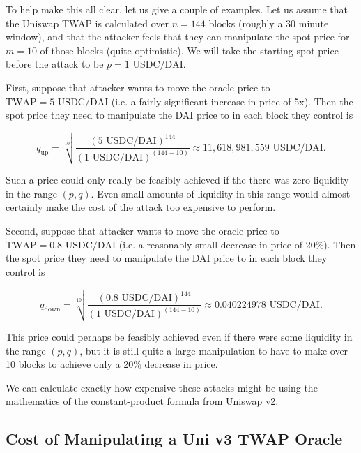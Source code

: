 \documentclass[a4paper, 11pt]{article}
\begin{document}
To help make this all clear, let us give a couple of examples. Let us assume that the Uniswap TWAP is calculated over $n = 144$ blocks (roughly a 30 minute window), and that the attacker feels that they can manipulate the spot price for $m = 10$ of those blocks (quite optimistic). We will take the starting spot price before the attack to be $p = 1 \text{ USDC} / \text{DAI}$.

First, suppose that attacker wants to move the oracle price to $\text{TWAP} = 5 \text{ USDC} / \text{DAI}$ (i.e. a fairly significant increase in price of 5x). Then the spot price they need to manipulate the DAI price to in each block they control is

\begin{equation}
\label{eq:q-spot-price-1}
q_{\text{up}}
=
\sqrt[10]{\frac{(5 \text{ USDC} / \text{DAI})^{144}}{(1 \text{ USDC} / \text{DAI})^{(144 - 10)}}}
\approx
11,618,981,559  \text{ USDC} / \text{DAI}.
\end{equation}

Such a price could only really be feasibly achieved if the there was zero liquidity in the range $(p, q)$. Even small amounts of liquidity in this range would almost certainly make the cost of the attack too expensive to perform.

Second, suppose that attacker wants to move the oracle price to $\text{TWAP} = 0.8 \text{ USDC} / \text{DAI}$ (i.e. a reasonably small decrease in price of 20\%). Then the spot price they need to manipulate the DAI price to in each block they control is

\begin{equation}
\label{eq:q-spot-price-2}
q_{\text{down}}
=
\sqrt[10]{\frac{(0.8 \text{ USDC} / \text{DAI})^{144}}{(1 \text{ USDC} / \text{DAI})^{(144 - 10)}}}
\approx
0.040224978 \text{ USDC} / \text{DAI}.
\end{equation}

This price could perhaps be feasibly achieved even if there were some liquidity in the range $(p, q)$, but it is still quite a large manipulation to have to make over 10 blocks to achieve only a 20\% decrease in price. 

We can calculate exactly how expensive these attacks might be using the mathematics of the constant-product formula from Uniswap v2. 

\subsection{Cost of Manipulating a Uni v3 TWAP Oracle}
\end{document}
